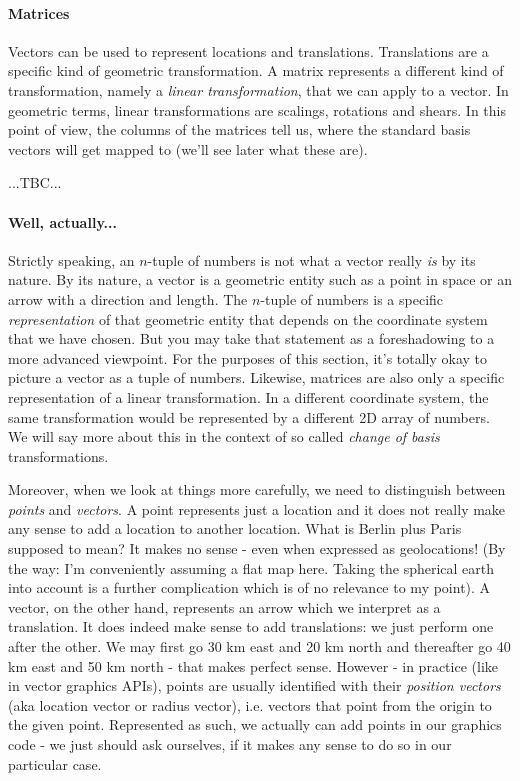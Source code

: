 \paragraph{Matrices}
Vectors can be used to represent locations and translations. Translations are a specific kind of geometric transformation. A matrix represents a different kind of transformation, namely a \emph{linear transformation}, that we can apply to a vector. In geometric terms, linear transformations are scalings, rotations and shears. In this point of view, the columns of the matrices tell us, where the standard basis vectors will get mapped to (we'll see later what these are).

...TBC...





\paragraph{Well, actually...}
Strictly speaking, an $n$-tuple of numbers is not what a vector really \emph{is} by its nature. By its nature, a vector is a geometric entity such as a point in space or an arrow with a direction and length. The $n$-tuple of numbers is a specific \emph{representation} of that geometric entity that depends on the coordinate system that we have chosen. But you may take that statement as a foreshadowing to a more advanced viewpoint. For the purposes of this section, it's totally okay to picture a vector as a tuple of numbers. Likewise, matrices are also only a specific representation of a linear transformation. In a different coordinate system, the same transformation would be represented by a different 2D array of numbers. We will say more about this in the context of so called \emph{change of basis} transformations.

\medskip
Moreover, when we look at things more carefully, we need to distinguish between \emph{points} and \emph{vectors}. A point represents just a location and it does not really make any sense to add a location to another location. What is Berlin plus Paris supposed to mean? It makes no sense - even when expressed as geolocations! (By the way: I'm conveniently assuming a flat map here. Taking the spherical earth into account is a further complication which is of no relevance to my point). A vector, on the other hand, represents an arrow which we interpret as a translation. It does indeed make sense to add translations: we just perform one after the other. We may first go 30 km east and 20 km north and thereafter go 40 km east and 50 km north - that makes perfect sense. However - in practice (like in vector graphics APIs), points are usually identified with their \emph{position vectors} (aka location vector or radius vector), i.e. vectors that point from the origin to the given point. Represented as such, we actually can add points in our graphics code - we just should ask ourselves, if it makes any sense to do so in our particular case.

